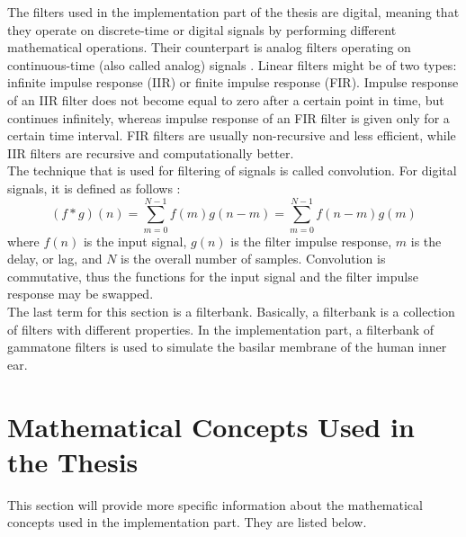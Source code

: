 The filters used in the implementation part of the thesis are digital, meaning that they ope\-rate on discrete-time or digital signals by performing different mathematical operations. Their counterpart is analog filters operating on continuous-time (also called analog) signals \cite{Shenoi2005}. Linear filters might be of two types: infinite impulse response (IIR) or finite impulse response (FIR). Impulse response of an IIR filter does not become equal to zero after a certain point in time, but continues infinitely, whereas impulse response of an FIR filter is given only for a certain time interval. FIR filters are usually non-recursive and less efficient, while IIR filters are recursive and computationally better.\\

The technique that is used for filtering of signals is called convolution. For digital signals, it is defined as follows \cite{Schnupp2011}:
\begin{equation}
	(f*g)(n) = \sum_{m=0}^{N-1}f(m)g(n - m) = \sum_{m=0}^{N-1}f(n - m)g(m)
\end{equation}
where $f(n)$ is the input signal, $g(n)$ is the filter impulse response, $m$ is the delay, or lag, and $N$ is the overall number of samples. Convolution is commutative, thus the functions for the input signal and the filter impulse response may be swapped.\\

The last term for this section is a filterbank. Basically, a filterbank is a collection of filters with different properties. In the implementation part, a filterbank of gammatone filters is used to simulate the basilar membrane of the human inner ear.

\section{Mathematical Concepts Used in the Thesis}\label{section:math_concepts}

This section will provide more specific information about the mathematical concepts used in the implementation part. They are listed below.


